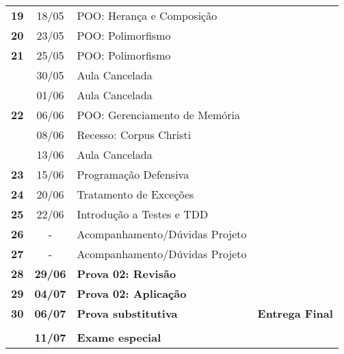 \documentclass[11pt]{article}
\begin{document}
\begin{center}
\begin{tabular}{>{\bfseries}ccl>{\bfseries}c}
19 & 18/05 & POO: Herança e Composição & \\[0pt]
20 & 23/05 & POO: Polimorfismo & \\[0pt]
21 & 25/05 & POO: Polimorfismo & \\[0pt]
\rowcolor{green!40} & 30/05 & Aula Cancelada & \\[0pt]
\rowcolor{green!40} & 01/06 & Aula Cancelada & \\[0pt]
22 & 06/06 & POO: Gerenciamento de Memória & \\[0pt]
\rowcolor{green!40} & 08/06 & Recesso: Corpus Christi & \\[0pt]
\rowcolor{green!40} & 13/06 & Aula Cancelada & \\[0pt]
23 & 15/06 & Programação Defensiva & \\[0pt]
24 & 20/06 & Tratamento de Exceções & \\[0pt]
25 & 22/06 & Introdução a Testes e TDD & \\[0pt]
26 & - & Acompanhamento/Dúvidas Projeto & \\[0pt]
27 & - & Acompanhamento/Dúvidas Projeto & \\[0pt]
\rowcolor{yellow!50} 28 & \textbf{29/06} & \textbf{Prova 02: Revisão} & \\[0pt]
\rowcolor{yellow!50} 29 & \textbf{04/07} & \textbf{Prova 02: Aplicação} & \\[0pt]
\rowcolor{yellow!50} 30 & \textbf{06/07} & \textbf{Prova substitutiva} & Entrega Final\\[0pt]
 &  &  & \\[0pt]
\rowcolor{yellow!50} & \textbf{11/07} & \textbf{Exame especial} & \\[0pt]
\bottomrule
\end{tabular}
\end{center}
\end{document}
